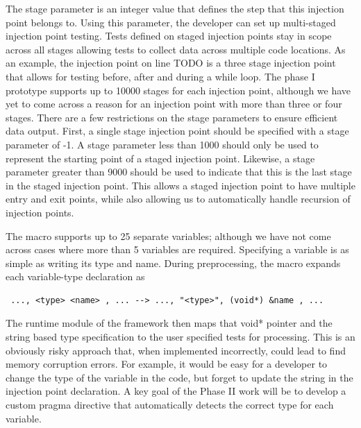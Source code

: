 The stage parameter is an integer value that defines the step that this injection point belongs to. Using this parameter, the developer can set up multi-staged injection point testing. Tests defined on staged injection points stay in scope across 
all stages allowing tests to collect data across multiple code locations. As an example, the injection point on line TODO is a three stage injection point that allows for testing before, after and during a while loop. The phase I prototype supports up to 10000 stages for each injection point, although we have yet to come across a reason for an injection point with more than three or four stages. There are a few restrictions on the stage parameters to ensure efficient data output. First, a single stage injection point should be specified with a stage parameter of -1. A stage parameter less than 1000 should only be used to represent the starting point of a staged injection point. Likewise, a stage parameter greater than 9000 should be used to indicate that this is the last stage in the staged injection point. This allows a staged injection point to have multiple entry and exit points, while also allowing us to automatically handle recursion of injection points.  

The macro supports up to 25 separate variables; although we have not come across cases where more than 5 variables are required. Specifying a variable is as simple 
as writing its type and name. During preprocessing, the macro expands each variable-type declaration as 
\begin{verbatim}
 ..., <type> <name> , ... --> ..., "<type>", (void*) &name , ... 
\end{verbatim}

The runtime module of the framework then maps that void* pointer and the string based type specification to the user specified tests for processing. This is
an obviously risky approach that, when implemented incorrectly, could lead to find memory corruption errors. For example, it would be easy for a developer to
change the type of the variable in the code, but forget to update the string in the injection point declaration. A key goal of the Phase II work will be to 
develop a custom pragma directive that automatically detects the correct type for each variable. 

